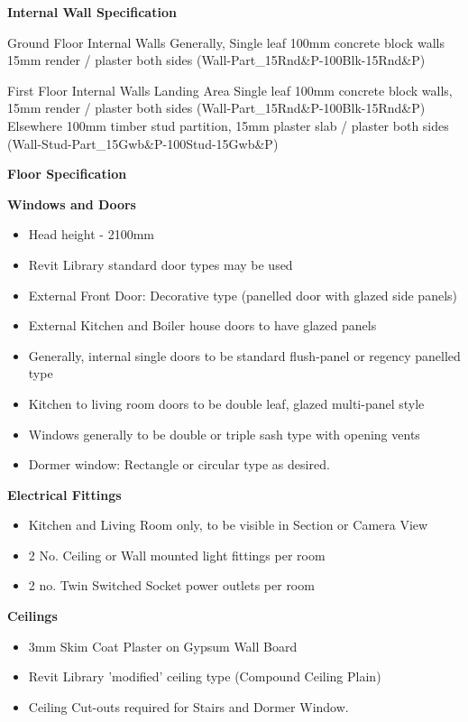 \textbf{Internal Wall Specification}

Ground Floor Internal Walls
Generally, Single leaf 100mm concrete block walls 15mm render / plaster both sides
(Wall-Part\_15Rnd\&P-100Blk-15Rnd\&P)

First Floor Internal Walls 
Landing Area
Single leaf 100mm concrete block walls, 15mm render / plaster both sides
(Wall-Part\_15Rnd\&P-100Blk-15Rnd\&P)
Elsewhere
100mm timber stud partition, 15mm plaster slab / plaster both sides
(Wall-Stud-Part\_15Gwb\&P-100Stud-15Gwb\&P)


\textbf{Floor Specification}







\textbf{Windows and Doors}
\begin{itemize}
	\item Head height - 2100mm
	\item Revit Library standard door types may be used
	\item External Front Door: Decorative type (panelled door with glazed side panels)
	\item External Kitchen and Boiler house doors to have glazed panels
	\item Generally, internal single doors to be standard flush-panel or regency panelled type
	\item Kitchen to living room doors to be double leaf, glazed multi-panel style
	\item Windows generally to be double or triple sash type with opening vents
	\item Dormer window: Rectangle or circular type as desired.
\end{itemize}






\textbf{Electrical Fittings}
\begin{itemize}
	\item Kitchen and Living Room only, to be visible in Section or Camera View
	\item 2 No. Ceiling or Wall mounted light fittings per room
	\item 2 no. Twin Switched Socket power outlets per room
\end{itemize}





\textbf{Ceilings}
\begin{itemize}
	\item 3mm Skim Coat Plaster on Gypsum Wall Board
	\item Revit Library 'modified' ceiling type (Compound Ceiling Plain)
	\item Ceiling Cut-outs required for Stairs and Dormer Window.
\end{itemize}



